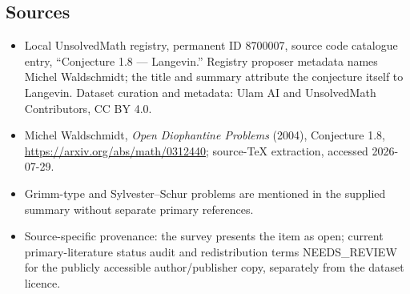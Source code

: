 \documentclass[11pt]{article}
\begin{document}
\subsection{Sources}
\begin{itemize}
\item Local UnsolvedMath registry, permanent ID 8700007, source code catalogue entry, ``Conjecture 1.8 --- Langevin.'' Registry proposer metadata names Michel Waldschmidt; the title and summary attribute the conjecture itself to Langevin. Dataset curation and metadata: Ulam AI and UnsolvedMath Contributors, CC BY 4.0.
\item Michel Waldschmidt, \emph{Open Diophantine Problems} (2004), Conjecture 1.8, \url{https://arxiv.org/abs/math/0312440}; source-TeX extraction, accessed 2026-07-29.
\item Grimm-type and Sylvester--Schur problems are mentioned in the supplied summary without separate primary references.
\item Source-specific provenance: the survey presents the item as open; current primary-literature status audit and redistribution terms NEEDS\_REVIEW for the publicly accessible author/publisher copy, separately from the dataset licence.
\end{itemize}
\end{document}
